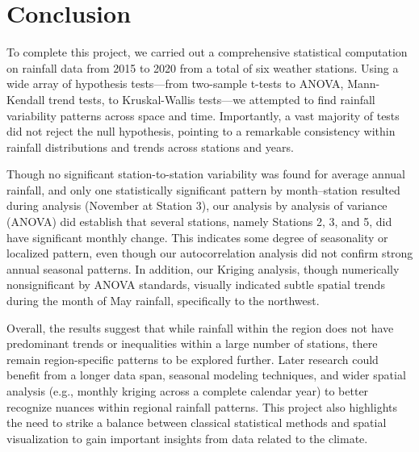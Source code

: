 \documentclass[12pt]{article}
\theoremstyle{definition}
\begin{document}
\section{Conclusion}
To complete this project, we carried out a comprehensive statistical computation on rainfall data from 2015 to 2020 from a total of six weather stations. Using a wide array of hypothesis tests—from two-sample t-tests to ANOVA, Mann-Kendall trend tests, to Kruskal-Wallis tests—we attempted to find rainfall variability patterns across space and time. Importantly, a vast majority of tests did not reject the null hypothesis, pointing to a remarkable consistency within rainfall distributions and trends across stations and years.

Though no significant station-to-station variability was found for average annual rainfall, and only one statistically significant pattern by month–station resulted during analysis (November at Station 3), our analysis by analysis of variance (ANOVA) did establish that several stations, namely Stations 2, 3, and 5, did have significant monthly change. This indicates some degree of seasonality or localized pattern, even though our autocorrelation analysis did not confirm strong annual seasonal patterns. In addition, our Kriging analysis, though numerically nonsignificant by ANOVA standards, visually indicated subtle spatial trends during the month of May rainfall, specifically to the northwest.

Overall, the results suggest that while rainfall within the region does not have predominant trends or inequalities within a large number of stations, there remain region-specific patterns to be explored further. Later research could benefit from a longer data span, seasonal modeling techniques, and wider spatial analysis (e.g., monthly kriging across a complete calendar year) to better recognize nuances within regional rainfall patterns. This project also highlights the need to strike a balance between classical statistical methods and spatial visualization to gain important insights from data related to the climate.
\end{document}
